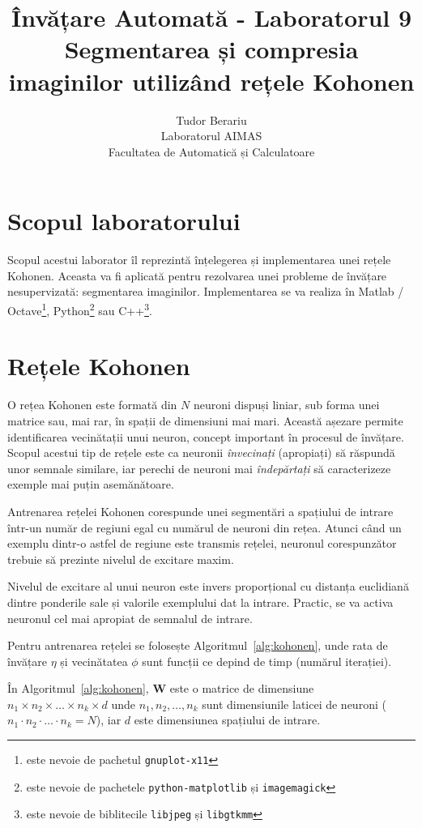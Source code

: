 \documentclass[12pt]{article}%
\title{Învățare Automată - Laboratorul 9 \\ \textbf{Segmentarea și
    compresia imaginilor utilizând rețele Kohonen}}%
\author{Tudor Berariu \\ Laboratorul AIMAS \\
  Facultatea de Automatică și Calculatoare}%
\newcommand{\mat}{{\color{brightmaroon} Matlab / Octave}}
\newcommand{\pyt}{{\color{cadmiumgreen} Python}}
\newcommand{\cc}{{\color{cobalt} C++}}
\begin{document}
\maketitle%

\section{Scopul laboratorului}
\label{sec:son}

Scopul acestui laborator îl reprezintă înțelegerea și implementarea
unei rețele Kohonen. Aceasta va fi aplicată pentru rezolvarea unei
probleme de învățare nesupervizată: segmentarea
imaginilor. Implementarea se va realiza în \mat\footnote{este nevoie
  de pachetul \texttt{gnuplot-x11}}, \pyt\footnote{este nevoie de pachetele
  \texttt{python-matplotlib} și \texttt{imagemagick}} sau
\cc\footnote{este nevoie de biblitecile \texttt{libjpeg} și
  \texttt{libgtkmm}}.

\section{Rețele Kohonen}
\label{sec:train}

O rețea Kohonen este formată din $N$ neuroni dispuși liniar, sub forma
unei matrice sau, mai rar, în spații de dimensiuni mai mari. Această
așezare permite identificarea vecinătații unui neuron, concept
important în procesul de învățare. Scopul acestui tip de rețele este
ca neuronii \emph{învecinați} (apropiați) să răspundă unor semnale
similare, iar perechi de neuroni mai \emph{îndepărtați} să
caracterizeze exemple mai puțin asemănătoare.

Antrenarea rețelei Kohonen corespunde unei segmentări a spațiului de
intrare într-un număr de regiuni egal cu numărul de neuroni din
rețea. Atunci când un exemplu dintr-o astfel de regiune este transmis
rețelei, neuronul corespunzător trebuie să prezinte nivelul de
excitare maxim.

Nivelul de excitare al unui neuron este invers proporțional cu
distanța euclidiană dintre ponderile sale și valorile exemplului dat
la intrare. Practic, se va activa neuronul cel mai apropiat de
semnalul de intrare.

Pentru antrenarea rețelei se folosește Algoritmul~\ref{alg:kohonen},
unde rata de învățare $\eta$ și vecinătatea $\phi$ sunt funcții ce
depind de timp (numărul iterației).

În Algoritmul~\ref{alg:kohonen}, $\mathbf{W}$ este o matrice de
dimensiune $n_1 \times n_2 \times \ldots \times n_k \times d$ unde
$n_1, n_2, \ldots, n_k$ sunt dimensiunile laticei de neuroni ($n_1
\cdot n_2 \cdot \ldots \cdot n_k = N$), iar $d$ este dimensiunea
spațiului de intrare.
\end{document}
